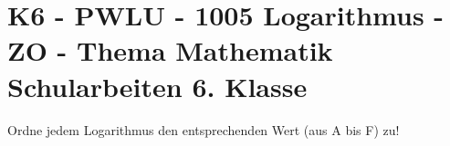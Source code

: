 \section{K6 - PWLU - 1005 Logarithmus - ZO - Thema Mathematik Schularbeiten 6. Klasse}

\begin{beispiel}[K6 - PWLU]{1} %
			Ordne jedem Logarithmus den entsprechenden Wert (aus A bis F) zu!
			
							\end{beispiel}